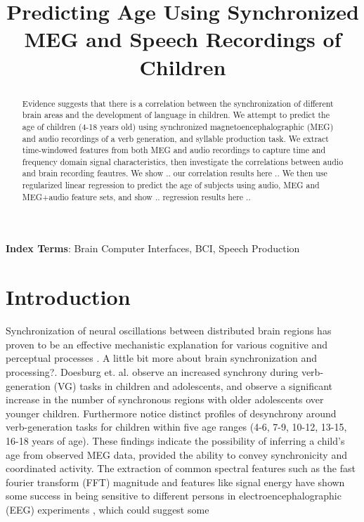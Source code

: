 \documentclass[a4paper]{article}
\title{Predicting Age Using Synchronized MEG and Speech Recordings of Children}
\begin{document}
\maketitle
% 
\begin{abstract}

  Evidence suggests that there is a correlation between the synchronization of different brain areas and the development of language in children. We attempt to predict the age of children (4-18 years old) using synchronized magnetoencephalographic (MEG) and audio recordings of a verb generation, and syllable production task. We extract time-windowed features from both MEG and audio recordings to capture time and frequency domain signal characteristics, then investigate the correlations between audio and brain recording feautres. We show .. our correlation results here .. We then use regularized linear regression to predict the age of subjects using audio, MEG and MEG+audio feature sets, and show .. regression results here .. 
   
\end{abstract}


\noindent\textbf{Index Terms}: Brain Computer Interfaces, BCI, Speech Production

\section{Introduction}

Synchronization of neural oscillations between distributed brain regions has proven to be an effective mechanistic explanation for various cognitive and perceptual processes \cite{Fries2015} \cite{Uhlhass2009} \cite{NeuralSync}. A little bit more about brain synchronization and processing?. Doesburg et. al. \cite{Doesburg2016} observe an increased synchrony during verb-generation (VG) tasks in children and adolescents, and observe a significant increase in the number of synchronous regions with older adolescents over younger children. Furthermore \cite{Yu2014} notice distinct profiles of desynchrony around verb-generation tasks for children within five age ranges (4-6, 7-9, 10-12, 13-15, 16-18 years of age). These findings indicate the possibility of inferring a child's age from observed MEG data, provided the ability to convey synchronicity and coordinated activity. The extraction of common spectral features such as the fast fourier transform (FFT) magnitude and features like signal energy have shown some success in being sensitive to different persons in electroencephalographic (EEG) experiments \cite{Nguyen2012} \cite{Poulos2001}, which could suggest some 
 
\end{document}
